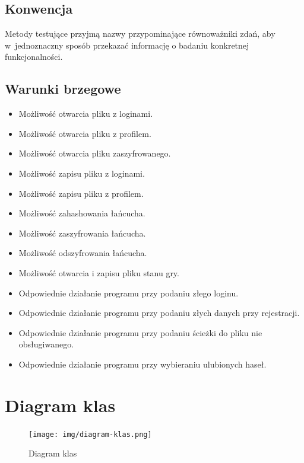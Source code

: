 \documentclass[a4paper]{article}
\begin{document}
\subsection{Konwencja}
Metody testujące przyjmą nazwy przypominające równoważniki zdań, aby w~jednoznaczny sposób przekazać informację o badaniu konkretnej funkcjonalności.


\subsection{Warunki brzegowe}
\begin{itemize}
    \item Możliwość otwarcia pliku z loginami.
    \item Możliwość otwarcia pliku z profilem.
    \item Możliwość otwarcia pliku zaszyfrowanego.
    \item Możliwość zapisu pliku z loginami.
    \item Możliwość zapisu pliku z profilem.
    \item Możliwość zahashowania łańcucha.
    \item Możliwość zaszyfrowania łańcucha.
    \item Możliwość odszyfrowania łańcucha.
    \item Możliwość otwarcia i zapisu pliku stanu gry.
    \item Odpowiednie działanie programu przy podaniu złego loginu.
    \item Odpowiednie działanie programu przy podaniu złych danych przy rejestracji.
    \item Odpowiednie działanie programu przy podaniu ścieżki do pliku nie obsługiwanego.
    \item Odpowiednie działanie programu przy wybieraniu ulubionych haseł.
\end{itemize}

\section{Diagram klas}
\begin{figure}[H]
    \centering
    \texttt{[image: img/diagram-klas.png]}
    \caption{Diagram klas}
    \label{fig:diagram}
\end{figure}
\label{end}
\end{document}
